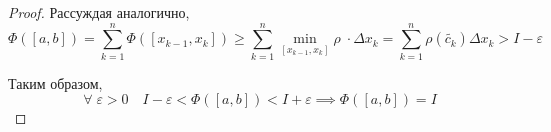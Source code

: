 \documentclass[../main.tex]{subfiles}
\begin{document}
\begin{proof}
    Рассуждая аналогично, \[ \Phi\left( \left[ a,b\right]\right)= \sum\limits_{ k=1}^{ n} \Phi\left( \left[ x_{k-1}, x_k\right]\right) \geq \sum\limits_{ k=1}^{ n} \min\limits_{ \left[ x_{k-1}, x_k\right]} \rho \;\cdot \Delta x_k= \sum\limits_{ k=1}^{ n} \rho\left( \tilde{c_k}\right) \Delta x_k>I- \varepsilon \]

    Таким образом, \[ \forall \; \varepsilon >0\quad I- \varepsilon <\Phi\left( \left[ a,b\right]\right)<I+ \varepsilon \implies \Phi\left( \left[ a,b\right]\right)=I \]
\end{proof}
\end{document}
